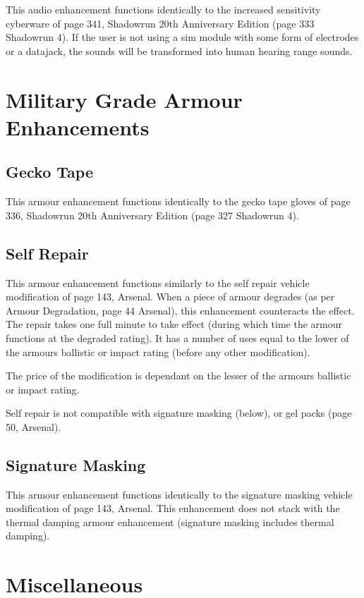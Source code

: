 \documentclass{article}
\begin{document}
This audio enhancement functions identically to the increased sensitivity cyberware of page 341, Shadowrun 20th Anniversary Edition (page 333 Shadowrun 4).  If the user is not using a sim module with some form of electrodes or a datajack, the sounds will be transformed into human hearing range sounds.

\section*{Military Grade Armour \newline Enhancements}

\subsection*{Gecko Tape}

This armour enhancement functions identically to the gecko tape gloves of page 336, Shadowrun 20th Anniversary Edition (page 327 Shadowrun 4).

\subsection*{Self Repair}

This armour enhancement functions similarly to the self repair vehicle modification of page 143, Arsenal.  When a piece of armour degrades (as per Armour Degradation, page 44 Arsenal), this enhancement counteracts the effect.  The repair takes one full minute to take effect (during which time the armour functions at the degraded rating).  It has a number of uses equal to the lower of the armours ballistic or impact rating (before any other modification).

The price of the modification is dependant on the lesser of the armours ballistic or impact rating.

Self repair is not compatible with signature masking (below), or gel packs (page 50, Arsenal).

\subsection*{Signature Masking}

This armour enhancement functions identically to the signature masking vehicle modification of page 143, Arsenal.  This enhancement does not stack with the thermal damping armour enhancement (signature masking includes thermal damping).

\section*{Miscellaneous}
\end{document}

